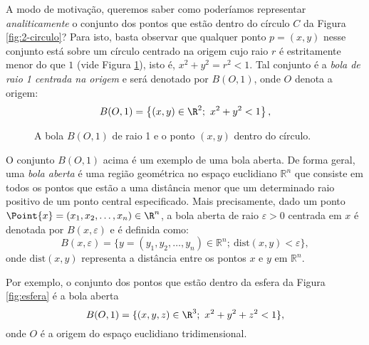 A modo de motivação, queremos saber como poderíamos representar \textit{analiticamente} o conjunto dos pontos que estão dentro do círculo $C$ da Figura \ref{fig:2-circulo}? Para isto, basta observar que qualquer ponto $p=(x,y)$ nesse conjunto está sobre um círculo centrado na origem cujo raio $r$ é estritamente menor do que $1$ (vide Figura \ref{fig:2-circulo_2}), isto é, $x^2+y^2=r^2<1$. 
Tal conjunto é a \textit{bola de raio 1 centrada na origem} e será denotado por $B(O,1)$, onde $O$ denota a origem:
$$B(O,1) =\left\{(x,y)\in\R^2;~x^2+y^2<1\right\},$$
\begin{figure}[!htb]
    \centering
{}
    \caption{A bola $B(O,1)$ de raio 1 e o ponto $(x,y)$ dentro do círculo.}
    \label{fig:2-circulo_2}
  \end{figure}


O conjunto $B(O,1)$ acima é um exemplo de uma bola aberta. De forma geral, uma \textit{bola aberta} é uma região geométrica no espaço euclidiano \(\mathbb{R}^n\) que consiste em todos os pontos que estão a uma distância menor que um determinado raio positivo de um ponto central especificado. Mais precisamente, dado um ponto $\Point{x}=(x_1,x_2,\dots,x_n)\in\R^n$, a bola aberta de raio $\varepsilon>0$ centrada em $x$ é denotada por \(B(x, \varepsilon)\) e é definida como:
\[B(x, \varepsilon) = \{y=(y_1,y_2,\dots,y_n) \in \mathbb{R}^n ;~ \text{dist}(x, y) < \varepsilon\},\]
onde \(\text{dist}(x, y)\) representa a distância entre os pontos \(x\) e \(y\) em \(\mathbb{R}^n\).


Por exemplo, o conjunto dos pontos que estão dentro da esfera 
da Figura \ref{fig:esfera} é a bola aberta 
\[B(O, 1) = \{(x,y,z)\in\R^3 ;~x^2+y^2+z^2 < 1\},\]
onde $O$ é a origem do espaço euclidiano tridimensional. 


